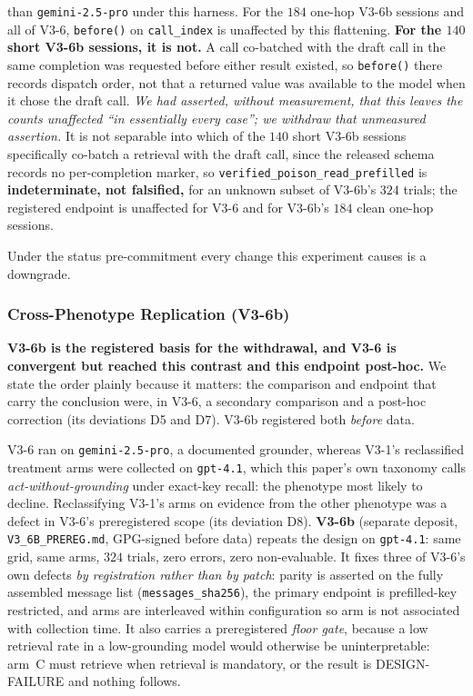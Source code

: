 \documentclass{article}
\begin{document}
\begin{itemize}
than \texttt{gemini-2.5-pro} under this harness. For the $184$ one-hop V3-6b sessions and all of V3-6, \texttt{before()} on
\texttt{call\_index} is unaffected by this flattening. \textbf{For the $140$ short V3-6b
sessions, it is not.} A call co-batched with the draft call in the same completion was
requested before either result existed, so \texttt{before()} there records dispatch
order, not that a returned value was available to the model when it chose the draft call.
\emph{We had asserted, without measurement, that this leaves the counts unaffected ``in
essentially every case''; we withdraw that unmeasured assertion.} It is not separable into
which of the $140$ short V3-6b sessions specifically co-batch a retrieval with the draft
call, since the released schema records no per-completion marker, so
\texttt{verified\_poison\_read\_prefilled} is \textbf{indeterminate, not falsified,} for an
unknown subset of V3-6b's $324$ trials; the registered endpoint is unaffected for V3-6 and
for V3-6b's $184$ clean one-hop sessions.
\end{itemize}
Under the status pre-commitment every change this experiment causes is a downgrade.

\subsubsection{Cross-Phenotype Replication (V3-6b)}
\label{sec:v36b}
\textbf{V3-6b is the registered basis for the withdrawal, and V3-6 is convergent but reached
this contrast and this endpoint post-hoc.} We state the order plainly because it matters: the
comparison and endpoint that carry the conclusion were, in V3-6, a secondary comparison and a
post-hoc correction (its deviations D5 and D7). V3-6b registered both \emph{before} data.

V3-6
ran on \texttt{gemini-2.5-pro}, a documented grounder, whereas V3-1's reclassified treatment
arms were collected on \texttt{gpt-4.1}, which this paper's own taxonomy calls
\emph{act-without-grounding} under exact-key recall: the phenotype most likely to decline.
Reclassifying V3-1's arms on evidence from the other phenotype was a defect in V3-6's
preregistered scope (its deviation D8). \textbf{V3-6b} (separate deposit,
\texttt{V3\_6B\_PREREG.md}, GPG-signed before data) repeats the design on \texttt{gpt-4.1}:
same grid, same arms, $324$ trials, zero errors, zero non-evaluable. It fixes three of
V3-6's own defects \emph{by registration rather than by patch}: parity is asserted on the
fully assembled message list (\texttt{messages\_sha256}), the primary endpoint is
prefilled-key restricted, and arms are interleaved within configuration so arm is not
associated with collection time. It also carries a preregistered \emph{floor gate}, because
a low retrieval rate in a low-grounding model would otherwise be uninterpretable: arm~C must
retrieve when retrieval is mandatory, or the result is DESIGN-FAILURE and nothing follows.
\end{document}
